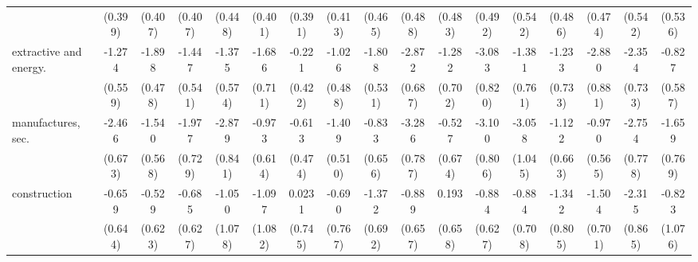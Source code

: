 {\begin{tabular}{l*{16}{c}}
                    &     (0.399)         &     (0.407)         &     (0.407)         &     (0.448)         &     (0.401)         &     (0.391)         &     (0.413)         &     (0.465)         &     (0.488)         &     (0.483)         &     (0.492)         &     (0.542)         &     (0.486)         &     (0.474)         &     (0.542)         &     (0.536)         \\
[1em]
extractive and energy.&      -1.274\sym{*}  &      -1.898\sym{***}&      -1.447\sym{**} &      -1.375\sym{*}  &      -1.686\sym{*}  &      -0.221         &      -1.026\sym{*}  &      -1.808\sym{***}&      -2.872\sym{***}&      -1.282         &      -3.083\sym{***}&      -1.381         &      -1.233         &      -2.880\sym{**} &      -2.354\sym{**} &      -0.827         \\
                    &     (0.559)         &     (0.478)         &     (0.541)         &     (0.574)         &     (0.711)         &     (0.422)         &     (0.488)         &     (0.531)         &     (0.687)         &     (0.702)         &     (0.820)         &     (0.761)         &     (0.733)         &     (0.881)         &     (0.733)         &     (0.587)         \\
[1em]
manufactures, sec.  &      -2.466\sym{***}&      -1.540\sym{**} &      -1.977\sym{**} &      -2.879\sym{***}&      -0.973         &      -0.613         &      -1.409\sym{**} &      -0.833         &      -3.286\sym{***}&      -0.527         &      -3.100\sym{***}&      -3.058\sym{**} &      -1.122         &      -0.970         &      -2.754\sym{***}&      -1.659\sym{*}  \\
                    &     (0.673)         &     (0.568)         &     (0.729)         &     (0.841)         &     (0.614)         &     (0.474)         &     (0.510)         &     (0.656)         &     (0.787)         &     (0.674)         &     (0.806)         &     (1.045)         &     (0.663)         &     (0.565)         &     (0.778)         &     (0.769)         \\
[1em]
construction        &      -0.659         &      -0.529         &      -0.685         &      -1.050         &      -1.097         &      0.0231         &      -0.690         &      -1.372\sym{*}  &      -0.889         &       0.193         &      -0.884         &      -0.884         &      -1.342         &      -1.504\sym{*}  &      -2.315\sym{**} &      -0.823         \\
                    &     (0.644)         &     (0.623)         &     (0.627)         &     (1.078)         &     (1.082)         &     (0.745)         &     (0.767)         &     (0.692)         &     (0.657)         &     (0.658)         &     (0.627)         &     (0.708)         &     (0.805)         &     (0.701)         &     (0.865)         &     (1.076)         \\

\end{tabular}}
